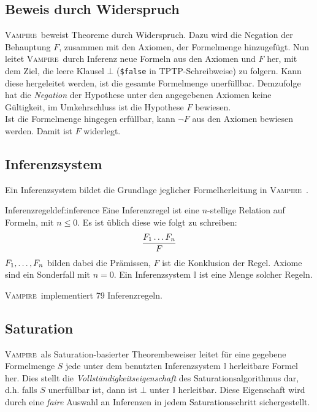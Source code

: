 \documentclass{article}
\newcommand{\vampire}{\textsc{Vampire}~}
\begin{document}
\subsection{Beweis durch Widerspruch}
\label{subsec:refutation}

\vampire beweist Theoreme durch Widerspruch.
Dazu wird die Negation der Behauptung $F$, zusammen mit den Axiomen,
der Formelmenge hinzugefügt.
Nun leitet \vampire durch Inferenz neue Formeln aus den Axiomen und $F$ her, 
mit dem Ziel, die leere Klausel $\bot$ (\texttt{\$false} in TPTP-Schreibweise) zu folgern.
Kann diese hergeleitet werden, ist die gesamte Formelmenge unerfüllbar.
Demzufolge hat die \textit{Negation} der Hypothese unter den angegebenen Axiomen keine Gültigkeit,
im Umkehrschluss ist die Hypothese $F$ bewiesen. \cite[S. 5]{cav2013}\\
Ist die Formelmenge hingegen erfüllbar, kann $\neg F$ aus den Axiomen bewiesen werden.
Damit ist $F$ widerlegt. \cite[S. 7]{cav2013}

\subsection{Inferenzsystem}
\label{subsec:inference}

Ein Inferenzsystem bildet die Grundlage jeglicher Formelherleitung in \vampire.

\begin{definition}{Inferenzregel}{def:inference}
	Eine Inferenzregel ist eine $n$-stellige Relation auf Formeln, mit $n \leq 0$.
	Es ist üblich diese wie folgt zu schreiben:
	\[ \frac {F_1  \mathellipsis F_n} F\]
	$F_1, \mathellipsis , F_n$ bilden dabei die Prämissen, $F$ ist die Konklusion der Regel.
	Axiome sind ein Sonderfall mit $n=0$. Ein Inferenzsystem $\mathds{I}$ ist eine Menge solcher
	Regeln.  \cite[S. 11]{cav2013}
\end{definition}

\vampire implementiert 79 Inferenzregeln. \cite[S. 6]{cav2013}

\subsection{Saturation}
\label{subsec:saturation}

\vampire als Saturation-basierter Theorembeweiser leitet für eine gegebene Formelmenge $S$
jede unter dem benutzten Inferenzsystem $\mathds{I}$ herleitbare Formel her. Dies stellt die
\emph{Vollständigkeitseigenschaft} des Saturationsalgorithmus dar, d.h. falls $S$ unerfüllbar ist,
dann ist $\bot$ unter $\mathds{I}$ herleitbar. Diese Eigenschaft wird durch eine \emph{faire}
Auswahl an Inferenzen in jedem Saturationsschritt sichergestellt. \cite[S. 12-13]{cav2013}
\end{document}
